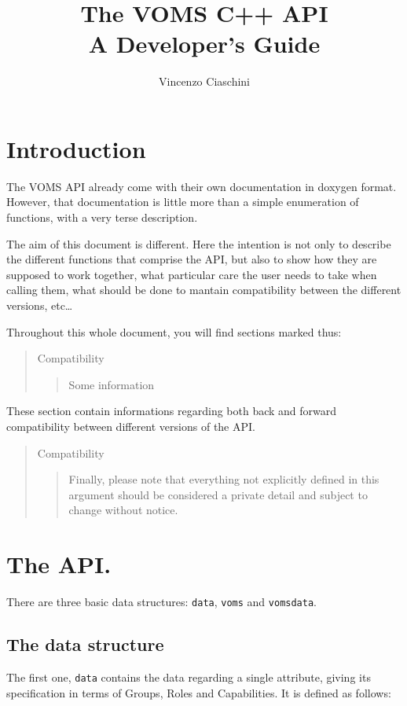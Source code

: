 \documentclass[a4paper]{book}
\newenvironment{compatibility}{\begin{quote}\color{red}Compatibility\begin{quote}}{\end{quote}\color{black}\end{quote}}
\begin{document}
\lstset{language=C++}
\begin{titlepage}
\title{The VOMS C++ API\\ A Developer's Guide}
\author{Vincenzo Ciaschini}
\end{titlepage}
\maketitle
\tableofcontents
\newpage
\chapter{Introduction}
The VOMS API already come with their own documentation in doxygen
format.  However, that documentation is little more than a simple
enumeration of functions, with a very terse description.

The aim of this document is different.  Here the intention is not only
to describe the different functions that comprise the API, but also to
show how they are supposed to work together, what particular care the
user needs to take when calling them, what should be done to mantain
compatibility between the different versions, etc\ldots

Throughout this whole document, you will find sections marked thus:
\begin{compatibility}
Some information
\end{compatibility}
These section contain informations regarding both back and forward
compatibility between different versions of the API.

\begin{compatibility}
Finally, please note that everything not explicitly defined in this
argument should be considered a private detail and subject to change
without notice.
\end{compatibility}

\chapter{The API.}
There are three basic data structures: \verb|data|\/, \verb|voms|
and \verb|vomsdata|.

\section{The data structure}
The first one, \verb|data| contains the data regarding a single
attribute, giving its specification in terms of Groups, Roles and
Capabilities. It is defined as follows:
\end{document}
